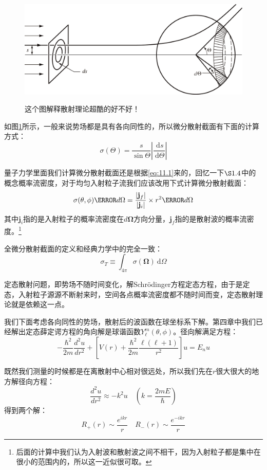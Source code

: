 \documentclass[a4paper,zihao=-4,linespread=1]{ctexrep}
\begin{document}
	\begin{figure}[h]
		\centering	
		\includegraphics[width=0.8 \linewidth]{fig/10-1.png}
		\label{fig:10.1}
		\caption{这个图解释散射理论超酷的好不好！}
	\end{figure}
	
	如图\ref{fig:10.1}所示，一般来说势场都是具有各向同性的，所以微分散射截面有下面的计算方式：
	\begin{equation}
		\sigma(\Theta)=\frac{s}{\sin\Theta}\left|\frac{\mathrm{~d}s}{\mathrm{~d}\Theta}\right|
	\end{equation}
	
	量子力学里面我们计算微分散射截面还是根据\ref{eq:11.1}来的，回忆一下$\S 1.4$中的概念概率流密度，对于均匀入射粒子流我们应该改用下式计算微分散射截面：
	\begin{equation}
		\label{eq:11.3}	
		\sigma(\theta,\phi) \cancel{d\Omega}	= \frac{\left|\mathbf{j}_f\right|}{\left|\mathbf{j}_i\right|}\times r^2 \cancel{d\Omega}
	\end{equation}
	其中$\mathbf{j}_i$指的是入射粒子的概率流密度在$d\mathbf{\Omega}$方向分量，$\mathbf{j}_f$指的是散射波的概率流密度。\footnote{后面的计算中我们认为入射波和散射波之间不相干，因为入射粒子都是集中在很小的范围内的，所以这一近似很可取。}
	
	全微分散射截面的定义和经典力学中的完全一致：
	\[\sigma_T\equiv \int_{4\pi}\sigma(\mathbf{\Omega})\mathrm{~d}\Omega\]
	
	定态散射问题，即势场不随时间变化，解Schr{\"o}dinger方程定态方程，由于是定态，入射粒子源源不断射来时，空间各点概率流密度都不随时间而变，定态散射理论就是依赖这一点。
	
	我们下面考虑各向同性的势场，散射后的波函数在球坐标系下解。第四章中我们已经解出定态薛定谔方程的角向解是球谐函数$Y_\ell^m(\theta,\phi)$。径向解满足方程：
	\[-\frac{\hbar^2}{2m}\frac{d^2u}{dr^2}+\left[V(r)+\frac{\hbar^2}{2m}\frac{\ell(\ell+1)}{r^2}\right]u=E_n u\]
	
	既然我们测量的时候都是在离散射中心相对很远处，所以我们先在$r$很大很大的地方解径向方程：
	\[\frac{d^2u}{dr^2}\approx -k^2u\quad (k=\frac{2mE}{\hbar})\]
	得到两个解：
	\[R_+(r)\sim \frac{e^{ikr}}{r}\quad R_-(r)\sim \frac{e^{-ikr}}{r}\]
	
\end{document}
